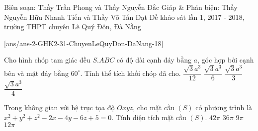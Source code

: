 
\begin{name}
{Biên soạn: Thầy Trần Phong và Thầy Nguyễn Đắc Giáp \& Phản biện: Thầy Nguyễn Hữu Nhanh Tiến và Thầy Võ Tấn Đạt}
{Đề khảo sát lần 1, 2017 - 2018, trường THPT chuyên Lê Quý Đôn, Đà Nẵng}
\end{name}
\setcounter{ex}{0}

[ans/ans-2-GHK2-31-ChuyenLeQuyDon-DaNang-18]

\begin{ex}%
	Cho hình chóp tam giác đều $S.ABC$ có độ dài cạnh đáy bằng $a$, góc hợp bởi cạnh bên và mặt đáy bằng $60^\circ$. Tính thể tích khối chóp đã cho.
	\choice
	{\True $\dfrac{\sqrt3a^3}{12}$}
	{$\dfrac{\sqrt3a^3}{6}$}
	{$\dfrac{\sqrt3a^3}{3}$}
	{$\dfrac{\sqrt3a^3}{4}$}
\end{ex}

\begin{ex}%
	Trong không gian với hệ trục tọa độ $Oxyz$, cho mặt cầu $(S)$ có phương trình là $x^2+y^2+z^2-2x-4y-6z+5=0$. Tính diện tích mặt cầu $(S)$.
	\choice
	{$42\pi$}
	{\True $36\pi$}
	{$9\pi$}
	{$12\pi$}
\end{ex}

